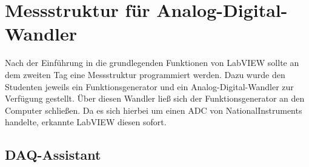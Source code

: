 \section{Messstruktur für Analog-Digital-Wandler}
	
	Nach der Einführung in die grundlegenden Funktionen von LabVIEW sollte an dem zweiten Tag eine Messstruktur programmiert werden.
	Dazu wurde den Studenten jeweils ein Funktionsgenerator und ein Analog-Digital-Wandler zur Verfügung gestellt.
	Über diesen Wandler ließ sich der Funktionsgenerator an den Computer schließen.
	Da es sich hierbei um einen ADC von NationalInstruments handelte, erkannte LabVIEW diesen sofort.
	
	\subsection{DAQ-Assistant}
	
